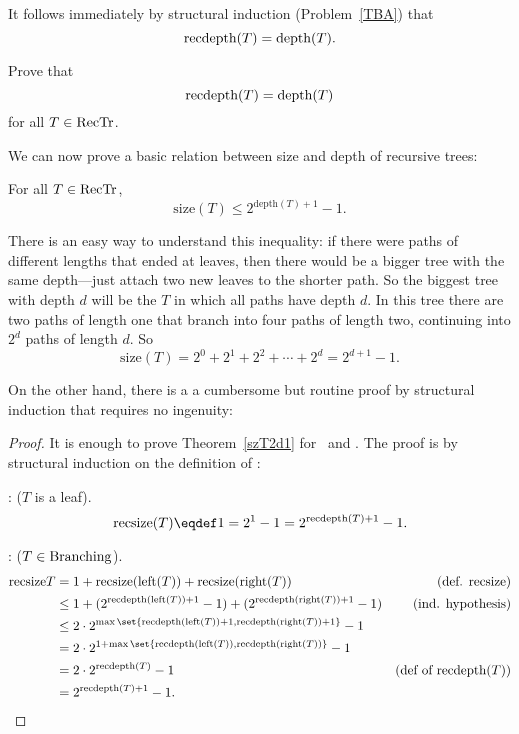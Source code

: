 It follows immediately by structural induction (Problem~\ref{TBA})
that
\begin{equation}\label{recdepth=depth}
\text{recdepth}(T) = \text{depth}(T).
\end{equation}

\begin{problem}
Prove that
\[
\text{recdepth}(T) = \text{depth}(T)
\]
for all $T \in \text{RecTr}$.

\begin{solution}
\end{solution}
\end{problem}

We can now prove a basic relation between size and depth of recursive
trees:
\begin{theorem}\label{szT2d1}
For all $T \in \text{RecTr}$,
\[
\text{size}(T) \leq 2^{\text{depth}(T)+1} - 1.
\]
\end{theorem}

There is an easy way to understand this inequality: if there were
paths of different lengths that ended at leaves, then there would be a
bigger tree with the same depth---just attach two new leaves to the
shorter path.  So the biggest tree with depth $d$ will be the
 $T$ in which all paths have depth $d$.  In this
tree there are two paths of length one that branch into four
paths of length two, continuing into $2^d$ paths of length $d$.  So
\[
\text{size}(T) = 2^0 + 2^1 + 2^2 + \cdots + 2^d = 2^{d+1}-1.
\]

On the other hand, there is a a cumbersome but routine proof by
structural induction that requires no ingenuity:

\begin{proof} 
It is enough to prove Theorem~\ref{szT2d1} for \trsize\ and \trdpth.
The proof is by structural induction on the definition of \rectr:

: ($T$ is a leaf).
\[
\trsize{(T)} \eqdef 1 = 2^1 - 1 = 2^{\trdpth{(T)}+1} - 1.
\]

: ($T \in \text{Branching}$).
\begin{align*}
\trsize{T}
& = 1 + \trsize{(\leftsub{(T)})} + \trsize{(\rightsub{(T)})}
              & \text{(def. \trsize{})}\\
& \leq 1 + (2^{\trdpth{(\leftsub{(T)})}+1} -1)  + (2^{\trdpth{(\rightsub{(T)})}+1} -1)
              & \text{(ind. hypothesis)}\\
& \leq  2\cdot 2^{\max\set{\trdpth{(\leftsub{(T)})}+1,\trdpth{(\rightsub{(T)})}+1}} - 1\\
& = 2\cdot 2^{1+\max\set{\trdpth{(\leftsub{(T)})},\trdpth{(\rightsub{(T)})}}} - 1\\
& = 2\cdot 2^{\trdpth{(T)}} - 1
              & \text{(def of $\trdpth{(T)}$)}\\
& =  2^{\trdpth{(T)}+1} - 1.
\end{align*}
\end{proof}

